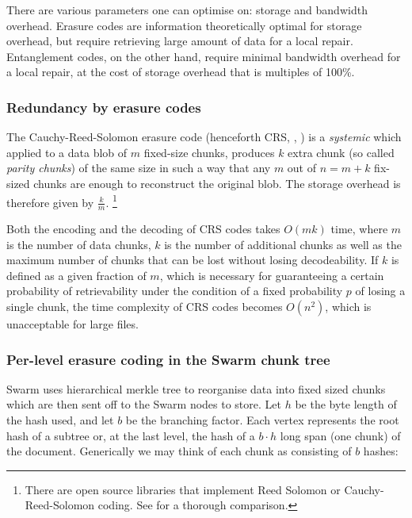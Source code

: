 There are various parameters one can optimise on: storage and bandwidth overhead. Erasure codes are information theoretically optimal for storage overhead, but require retrieving large amount of data for a local repair.
Entanglement codes, on the other hand, require minimal bandwidth overhead for a local repair, at the cost of storage overhead that is multiples of 100\%. 

\subsubsection{Redundancy by erasure codes}\label{sec:erasure}


The Cauchy-Reed-Solomon erasure code (henceforth CRS, \cite{lubyetal1995CRS}, \cite{plank2006optimizing}) is a \emph{systemic}  which applied to a data blob of $m$ fixed-size chunks, produces $k$ extra chunk (so called \emph{parity chunks}) of the same size in such a way that any $m$ out of $n=m+k$ fix-sized chunks are enough to reconstruct the original blob. The storage overhead is therefore given by $\frac{k}{m}$.%
%
\footnote{%
There are open source libraries that implement Reed Solomon or Cauchy-Reed-Solomon coding. See \cite{plank2009performance} for a thorough comparison.}

Both the encoding and the decoding of CRS codes takes $O(mk)$ time, where $m$ is the number of data chunks, $k$ is the number of additional chunks as well as the maximum number of chunks that can be lost without losing decodeability. If $k$ is defined as a given fraction of $m$, which is necessary for guaranteeing a certain probability of retrievability under the condition of a fixed probability $p$ of losing a single chunk, the time complexity of CRS codes becomes $O(n^2)$, which is unacceptable for large files. 

\subsubsection{Per-level erasure coding in the Swarm chunk tree}

Swarm uses hierarchical merkle tree \cite{merkle1980protocols} to reorganise data into fixed sized chunks which are then sent off to the Swarm nodes to store.
Let $h$ be the byte length of the hash used, and let $b$ be the branching factor. Each vertex represents the root hash of a subtree or, at the last level, the hash of a $b\cdot h$ long span (one chunk) of the document. Generically we may think of each chunk as consisting of $b$ hashes:


